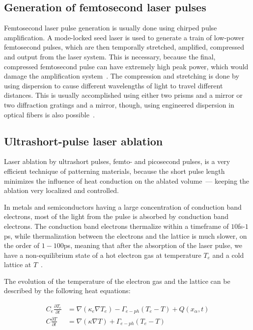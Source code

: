     \subsection{Generation of femtosecond laser pulses}
            Femtosecond laser pulse generation is usually done using chirped pulse amplification. A mode-locked seed laser is used
        to generate a train of low-power femtosecond pulses, which are then temporally stretched, amplified, compressed and output
        from the laser system. This is necessary, because the final, compressed femtosecond pulse can have extremely high peak power,
        which would damage the amplification system~\cite{harilal2014femtosecond}.
            The compression and stretching is done by using dispersion to cause different wavelengths of light to travel different distances.
        This is usually accomplished using either two prisms and a mirror or two diffraction gratings and a mirror, though, using engineered
        dispersion in optical fibers is also possible~\cite{harilal2014femtosecond}.

    \subsection{Ultrashort-pulse laser ablation}
            Laser ablation by ultrashort pulses, femto- and picosecond pulses, is a very efficient technique of patterning materials, because
        the short pulse length minimizes the influence of heat conduction on the ablated volume~--- keeping the ablation very localized and
        controlled.

            In metals and semiconductors having a large concentration of conduction band electrons, most of the light from the pulse is
        absorbed by conduction band electrons. The conduction band electrons thermalize within a timeframe of $10$fs-$1$ps, while thermalization
        between the electrons and the lattice is much slower, on the order of $1-100$ps, meaning that after the absorption of the laser pulse,
        we have a non-equilibrium state of a hot electron gas at temperature $T_e$ and a cold lattice at $T$~\cite{bauerle2013laser}.

        The evolution of the temperature of the electron gas and the lattice can be described by the following heat equations:

        \begin{align}
            C_e \frac{\partial T_e}{\partial t} &= \nabla (\kappa_e \nabla T_e) - \Gamma_{e-ph}(T_e - T) + Q(x_\alpha, t) \label{ablation:e-heat} \\
            C \frac{\partial T}{\partial t} &= \nabla (\kappa \nabla T) + \Gamma_{e-ph}(T_e - T) \label{ablation:heat}
        \end{align}

